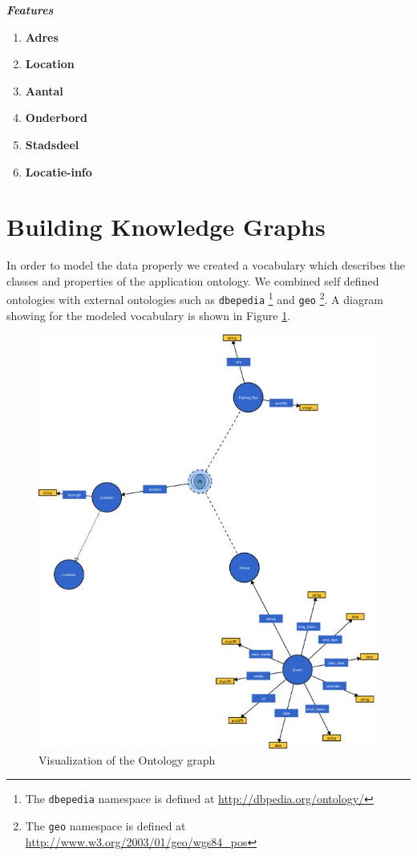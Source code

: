 \documentclass[runningheads,a4paper]{../../StyleFiles/llncs}
\begin{document}
\begin{center}
	\textbf{\emph{Features}}
	\setlength{\columnsep}{4em}
	\begin{multicols}{2}
		\begin{enumerate}
			\item \textbf{Adres}
			\item \textbf{Location}
			\item \textbf{Aantal}
			\item \textbf{Onderbord}
			\item \textbf{Stadsdeel}	
			\item \textbf{Locatie-info}				
		\end{enumerate}
	\end{multicols}
\end{center} 

\section{Building Knowledge Graphs}
In order to model the data properly we created a vocabulary which describes the classes and properties of the application ontology. We combined self defined ontologies with external ontologies such as \texttt{dbepedia} \footnote{The \texttt{dbepedia} namespace is defined at \url{http://dbpedia.org/ontology/}} and \texttt{geo} \footnote{The \texttt{geo} namespace is defined at \url{http://www.w3.org/2003/01/geo/wgs84_pos}}. A diagram showing for the modeled vocabulary is shown in Figure \ref{fig:vocabulary}. 

\begin{figure}[h]
	\centering
	\includegraphics[width=.7\textwidth]{img/vocab-graph.jpg}
	\caption{Visualization of the Ontology graph}
	\label{fig:vocabulary}
\end{figure}
\end{document}
